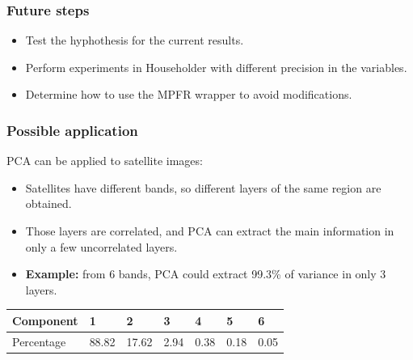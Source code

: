 \documentclass[serif, 12pt]{beamer}
\begin{document}

\begin{frame}
\frametitle{Future steps}

\begin{itemize}
\item Test the hyphothesis for the current results.
\item Perform experiments in Householder with different precision in the 
variables.
\item Determine how to use the MPFR wrapper to avoid modifications.
\end{itemize}

\end{frame}


\begin{frame}
\frametitle{Possible application}

PCA can be applied to satellite images:

\begin{itemize}
\item Satellites have different bands, so different layers of the same region 
are obtained.
\item Those layers are correlated, and PCA can extract the main information in 
only a few uncorrelated layers.
\item \textbf{Example:} from 6 bands, PCA could extract 99.3\% of variance in 
only 3 layers.
\end{itemize}

\begin{tabular}{l l l l l l l}
Component & 1 & 2 & 3 & 4 & 5 & 6 \\
\hline
Percentage & 88.82 & 17.62 & 2.94 & 0.38 & 0.18 & 0.05 \\
\end{tabular}

\end{frame}

\end{document}
